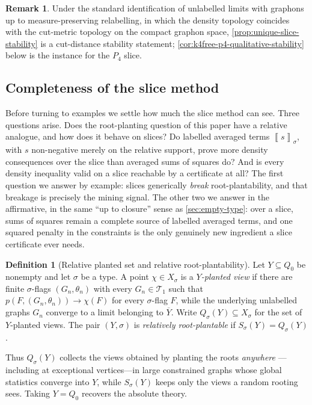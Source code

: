 \documentclass[11pt]{article}
\theoremstyle{definition}
\newtheorem{definition}[definition]{Definition}
\newtheorem{remark}[remark]{Remark}
\newcommand{\T}{\mathcal{T}}
\newcommand{\avg}[2]{\left\llbracket #1 \right\rrbracket_{#2}}
\begin{document}
\begin{remark}
Under the standard identification of unlabelled limits with graphons up to
measure-preserving relabelling, in which the density topology coincides with the
cut-metric topology on the compact graphon space,
\cref{prop:unique-slice-stability} is a cut-distance stability statement;
\cref{cor:k4free-p4-qualitative-stability} below is the instance for the $P_4$ slice.
\end{remark}

\subsection{Completeness of the slice method}\label{subsec:slice-completeness}

Before turning to examples we settle how much the slice method can see.  Three
questions arise.  Does the root-planting question of this paper have a relative
analogue, and how does it behave on slices?  Do labelled averaged terms
\(\avg{s}{\sigma}\), with \(s\) non-negative merely on the relative support, prove more
density consequences over the slice than averaged sums of squares do?  And is every
density inequality valid on a slice
reachable by a certificate at all?  The first question we answer by example: slices
generically \emph{break} root-plantability, and that breakage is precisely the mining
signal.  The other two we answer in the affirmative, in the same ``up to closure''
sense as \cref{sec:empty-type}: over a slice, sums of squares remain a complete
source of labelled averaged terms, and one squared penalty in the constraints is the only
genuinely new ingredient a slice certificate ever needs.

\begin{definition}[Relative planted set and relative root-plantability]\label{def:relative-plantability}
Let $Y\subseteq Q_0$ be nonempty and let $\sigma$ be a type.  A point $\chi\in X_\sigma$
is a \emph{$Y$-planted view} if there are finite $\sigma$-flags $(G_n,\theta_n)$ with
every $G_n\in\T_1$ such that $p(F,(G_n,\theta_n))\to\chi(F)$ for every $\sigma$-flag
$F$, while the underlying unlabelled graphs $G_n$ converge to a limit belonging to
$\overline Y$.  Write $Q_\sigma(Y)\subseteq X_\sigma$ for the set of $Y$-planted views.
The pair $(Y,\sigma)$ is \emph{relatively root-plantable} if
$S_\sigma(Y)=Q_\sigma(Y)$.
\end{definition}

Thus $Q_\sigma(Y)$ collects the views obtained by planting the roots \emph{anywhere}
---including at exceptional vertices---in large constrained graphs whose global
statistics converge into $Y$, while $S_\sigma(Y)$ keeps only the views a random rooting
sees.  Taking $Y=Q_0$ recovers the absolute theory.
\end{document}
